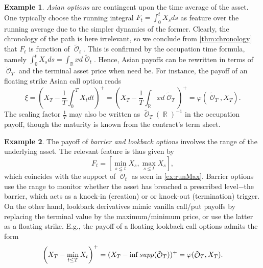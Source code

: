 \documentclass[11pt]{article}
\theoremstyle{plain}
\theoremstyle{definition}
\newtheorem{example}{Example}
\DeclareMathOperator{\R}{\mathbb{R}}
\DeclareMathOperator{\calO}{\mathcal{O}}
\begin{document}
\begin{example} \label{ex:Asian}  
   \textit{Asian options} are contingent upon the time average of the asset. One typically choose the running integral  $F_t =  \int_0^{t} X_s ds$ as feature over the running average due to the simpler dynamics of the former. %
   Clearly, the chronology of the path is here irrelevant, so we conclude from \cref{thm:chronology}  that $F_t$ is function of $\tilde{\calO}_t$.   %
   This is  confirmed by 
    the occupation time formula, namely  $\int_0^{t} X_s ds = \int_{\R} x d\tilde{\calO}_{t}$. Hence, Asian payoffs can be rewritten in terms of $\tilde{\calO}_T$ and the terminal asset price when need be. 
   For instance,  the payoff of an floating  strike Asian call option reads
    $$\xi = \left( X_{T} - \frac{1}{{T}} \int_0^{T} X_t dt\right)^+ = \left( X_{T} - \frac{1}{{T}}\int_{\R} x d\tilde{\calO}_{T} \right)^+= \varphi(\tilde{\calO}_{T},X_{T}). $$
  The scaling factor $\frac{1}{{T}}$ may also be written as $\tilde{\calO}_{T}(\R)^{-1}$ in the occupation payoff, though the maturity is known from the contract's term sheet. 
\end{example}%

\begin{example}\label{ex:Lkbk}
   The payoff of  \textit{barrier and lookback options} involves the range  of the underlying asset. The relevant feature is thus given by $$F_t = [\min\limits_{s\le t}X_s, \max\limits_{s\le t}X_s],$$ %
   which coincides with the support of $\tilde{\calO}_t$ as seen in \cref{ex:runMax}.  %
   Barrier options use the range to monitor whether the asset has breached a prescribed level$-$the barrier, which acts as a knock-in (creation) or or knock-out (termination) trigger. On the other hand, lookback derivatives mimic vanilla call/put payoffs 
   by replacing the terminal value by   the maximum/minimum price, or use the latter as a floating strike. 
E.g., the payoff of a floating lookback call options admits the form  
    $$\left(X_T - \min_{t\le {T}} X_t \right)^+ = (X_T - \inf \textnormal{supp}(\tilde{\calO}_{T}))^+= \varphi(\tilde{\calO}_{T},X_T).$$
\end{example}
\end{document}
